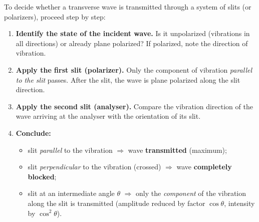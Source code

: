 \documentclass[11pt]{article}
\begin{document}
\begin{methode}
To decide whether a transverse wave is transmitted through a system of slits (or polarizers), proceed step by step:
\begin{enumerate}
\item \textbf{Identify the state of the incident wave.} Is it unpolarized (vibrations in all directions) or already plane polarized? If polarized, note the direction of vibration.
\item \textbf{Apply the first slit (polarizer).} Only the component of vibration \emph{parallel to the slit} passes. After the slit, the wave is plane polarized along the slit direction.
\item \textbf{Apply the second slit (analyser).} Compare the vibration direction of the wave arriving at the analyser with the orientation of its slit.
\item \textbf{Conclude:}
\begin{itemize}
\item slit \emph{parallel} to the vibration $\Rightarrow$ wave \textbf{transmitted} (maximum);
\item slit \emph{perpendicular} to the vibration (crossed) $\Rightarrow$ wave \textbf{completely blocked};
\item slit at an intermediate angle $\theta$ $\Rightarrow$ only the \emph{component} of the vibration along the slit is transmitted (amplitude reduced by factor $\cos\theta$, intensity by $\cos^2\theta$).
\end{itemize}
\end{enumerate}
\end{methode}
\end{document}

